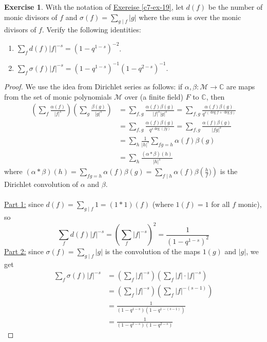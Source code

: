 \documentclass{article}
\theoremstyle{definition}
\newtheorem{exercise}{Exercise}
\begin{document}
\newpage

\begin{exercise}
With the notation of \hyperref[c7-ex-19]{Exereise \ref*{c7-ex-19}}, let $d(f)$ be the number of monic divisors of $f$ and $\sigma(f) = \sum_{g \mid f} |g|$ where the sum is over the monic divisors of $f$. Verify the following identities:
\begin{enumerate}
	\item $\sum_f d(f) |f|^{-s} = (1 - q^{1 - s})^{-2}$.
	\item $\sum_f \sigma(f) |f|^{-s} = (1 - q^{1 - s})^{-1} (1 - q^{2 - s})^{-1}$.
\end{enumerate}
\end{exercise}
\begin{proof}
We use the idea from Dirichlet series as follows: if $\alpha, \beta: \mathcal{M} \to \mathbb{C}$ are maps from the set of monic polynomials $\mathcal{M}$ over (a finite field) $F$ to $\mathbb{C}$, then
\begin{align*}
\left( \sum_{f} \frac{\alpha(f)}{|f|^s} \right) \left( \sum_{g} \frac{\beta(g)}{|g|^s} \right) & = \sum_{f, g} \frac{\alpha(f) \beta(g)}{|f|^s |g|^s} = \sum_{f, g} \frac{\alpha(f) \beta(g)}{q^{s (\deg f + \deg g)}} \\
& = \sum_{f, g} \frac{\alpha(f) \beta(g)}{q^{s \deg (fg)}} = \sum_{f, g} \frac{\alpha(f) \beta(g)}{|fg|^s} \\
& = \sum_h \frac{1}{|h|^s} \sum_{fg = h} \alpha(f) \beta(g) \\
& = \sum_h \frac{(\alpha * \beta)(h)}{|h|^s}
\end{align*}
where $(\alpha * \beta)(h) = \sum_{fg = h} \alpha(f) \beta(g) = \sum_{f \mid h} \alpha(f) \beta \left( \frac{h}{f}) \right)$ is the Dirichlet convolution of $\alpha$ and $\beta$.
\\
\\
\underline{Part 1:} since $d(f) = \sum_{g \mid f} 1 = (1 * 1) (f)$ (where $1(f) = 1$ for all $f$ monic), so
$$\sum_f d(f) |f|^{-s} = \left( \sum_f |f|^{-s} \right)^2 = \frac{1}{(1 - q^{1 - s})^2}$$
\underline{Part 2:} since $\sigma(f) = \sum_{g \mid f} |g|$ is the convolution of the maps $1(g)$ and $|g|$, we get
\begin{align*}
\sum_f \sigma(f) |f|^{-s} & = \left( \sum_f |f|^{-s} \right) \left( \sum_f |f| \cdot |f|^{-s} \right) \\
& = \left( \sum_f |f|^{-s} \right) \left( \sum_f |f|^{-(s - 1)} \right) \\
& = \frac{1}{(1 - q^{1 - s}) (1 - q^{1 - (s - 1)})} \\
& = \frac{1}{(1 - q^{1 - s}) (1 - q^{2 - s})}
\end{align*}
\end{proof}
\end{document}
